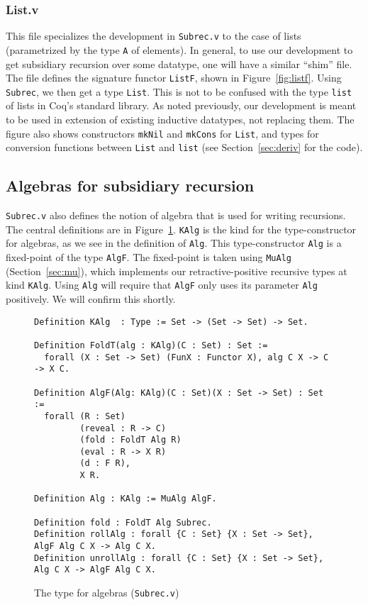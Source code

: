 \documentclass[a4paper,USenglish]{lipics-v2021}
\begin{document}
  \subsubsection{List.v}

  This file specializes the development in \verb|Subrec.v| to the case
  of lists (parametrized by the type \verb|A| of elements).  In
  general, to use our development to get subsidiary recursion over
  some datatype, one will have a similar ``shim'' file.  The file
  defines the signature functor \verb|ListF|, shown in
  Figure~\ref{fig:listf}.  Using \verb|Subrec|, we then get a type
  \verb|List|.  This is not to be confused with the type \verb|list|
  of lists in Coq's standard library.  As noted previously, our
  development is meant to be used in extension of existing inductive
  datatypes, not replacing them.  The figure also shows constructors
  \verb|mkNil| and \verb|mkCons| for \verb|List|, and types for
  conversion functions between \verb|List| and \verb|list| (see
  Section~\ref{sec:deriv} for the code).
  

\subsection{Algebras for subsidiary recursion}

\verb|Subrec.v| also defines the notion of algebra that is used for
writing recursions.  The central definitions are in
Figure~\ref{fig:algf}.  \verb|KAlg| is the kind for the
type-constructor for algebras, as we see in the definition of
\verb|Alg|.  This type-constructor \verb|Alg| is a fixed-point of the
type \verb|AlgF|.  The fixed-point is taken using \verb|MuAlg|
(Section~\ref{sec:mu}), which implements our retractive-positive
recursive types at kind \verb|KAlg|.  Using \verb|Alg| will require
that \verb|AlgF| only uses its parameter \verb|Alg| positively.  We
will confirm this shortly.

\begin{figure}
\begin{verbatim}
Definition KAlg  : Type := Set -> (Set -> Set) -> Set.

Definition FoldT(alg : KAlg)(C : Set) : Set :=
  forall (X : Set -> Set) (FunX : Functor X), alg C X -> C -> X C.

Definition AlgF(Alg: KAlg)(C : Set)(X : Set -> Set) : Set :=
  forall (R : Set)
         (reveal : R -> C)        
         (fold : FoldT Alg R)
         (eval : R -> X R)      
         (d : F R),             
         X R.

Definition Alg : KAlg := MuAlg AlgF.

Definition fold : FoldT Alg Subrec.
Definition rollAlg : forall {C : Set} {X : Set -> Set}, AlgF Alg C X -> Alg C X.
Definition unrollAlg : forall {C : Set} {X : Set -> Set}, Alg C X -> AlgF Alg C X.
\end{verbatim}
\caption{The type for algebras (\texttt{Subrec.v})}
\label{fig:algf}
\end{figure}
\end{document}
